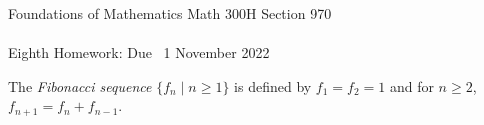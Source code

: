 \documentclass[12pt]{article}
\newcommand{\demph}[1]{{\color{blue}\sl{#1}}}
\begin{document}
\LARGE 
\noindent
{\color{Maroon}Foundations of Mathematics \hfill Math 300H Section 970}\vspace{2pt}\\
\Large \vspace{2pt}\\
\large
Eighth Homework: \hfill Due \  1 November 2022
\normalsize\medskip

\noindent{\color{blue}\rule{528.3675pt}{2pt}}

The \demph{Fibonacci sequence} $\{f_n\mid n\geq 1\}$ is defined by $f_1=f_2=1$ and for $n\geq 2$, $f_{n+1}=f_{n}+f_{n-1}$.

\noindent{\color{blue}\rule{528.3675pt}{2pt}}
\end{document}
